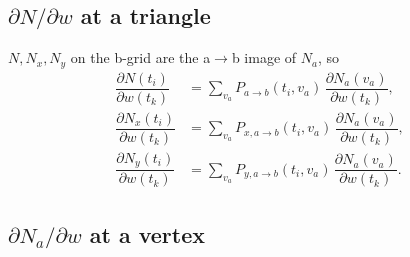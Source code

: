 \documentclass[11pt]{article}
\newcommand{\ti}{t_i}
\newcommand{\tk}{t_k}
\newcommand{\va}{v_a}
\newcommand{\pd}[2]{\dfrac{\partial #1}{\partial #2}}
\begin{document}
\subsection{$\partial N/\partial w$ at a triangle}

$N,N_x,N_y$ on the b-grid are the a$\to$b image of $N_a$, so
\begin{align}
\pd{N(\ti)}{w(\tk)} &= \sum_{\va} P_{a\to b}(\ti,\va)\,\pd{N_a(\va)}{w(\tk)}, \label{eq:dN}\\
\pd{N_x(\ti)}{w(\tk)} &= \sum_{\va} P_{x,a\to b}(\ti,\va)\,\pd{N_a(\va)}{w(\tk)}, \\
\pd{N_y(\ti)}{w(\tk)} &= \sum_{\va} P_{y,a\to b}(\ti,\va)\,\pd{N_a(\va)}{w(\tk)}.
\end{align}

\subsection{$\partial N_a/\partial w$ at a vertex}
\end{document}
